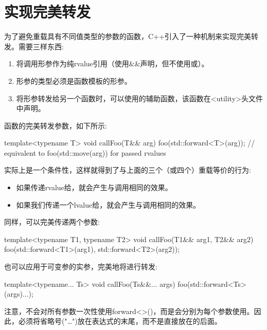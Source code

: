 \section{实现完美转发}
为了避免重载具有不同值类型的参数的函数，C++引入了一种机制来实现完美转发。需要三样东西:

\begin{enumerate}
	\item 将调用形参作为纯rvalue引用（使用\&\&声明，但不使用或）。
	\item 形参的类型必须是函数模板的形参。
	\item 将形参转发给另一个函数时，可以使用的辅助函数，该函数在<utility>头文件中声明。
\end{enumerate}

函数的完美转发参数，如下所示:

\begin{cppcode}
template<typename T>
void callFoo(T&& arg) {
	foo(std::forward<T>(arg)); // equivalent to foo(std::move(arg)) for passed rvalues
}
\end{cppcode}

实际上是一个条件性，这样就得到了与上面的三个（或四个）重载等价的行为:

\begin{itemize}
	\item 如果传递rvalue给，就会产生与调用相同的效果。
	\item 如果我们传递一个lvalue给，就会产生与调用相同的效果。
\end{itemize}

同样，可以完美传递两个参数:

\begin{cppcode}
template<typename T1, typename T2>
void callFoo(T1&& arg1, T2&& arg2) {
	foo(std::forward<T1>(arg1), std::forward<T2>(arg2));
}
\end{cppcode}

也可以应用于可变参的实参，完美地将进行转发:

\begin{cppcode}
template<typename... Ts>
void callFoo(Ts&&... args) {
	foo(std::forward<Ts>(args)...);
}
\end{cppcode}

注意，不会对所有参数一次性使用forward<>()，而是会分别为每个参数使用。因此，必须将省略号("…")放在表达式的末尾，而不是直接放在的后面。

